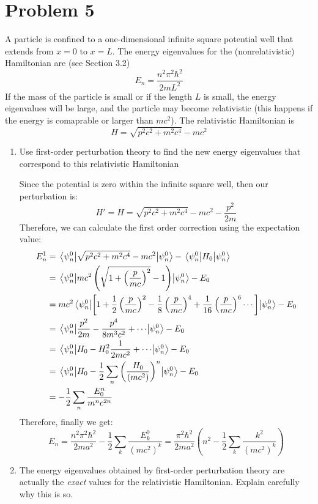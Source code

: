 \documentclass[10pt]{article}
\begin{document}
    \section*{Problem 5}
    A particle is confined to a one-dimensional infinite square potential well that extends from $x = 0$ to $x = L$. The energy eigenvalues for the (nonrelativistic) Hamiltonian are (see Section 3.2)
    \[ E_n = \frac{n^2 \pi^2 \hbar^2}{2mL^2}\] 
    If the mass of the particle is small or if the length $L$ is small, the energy eigenvalues will be large, and the particle may become relativistic (this happens if the energy is comaprable or larger than $mc^2$). The relativistic Hamiltonian is
    \[ H = \sqrt{p^2 c^2 + m^2 c^4} - mc^2\]
    \begin{enumerate}[label=(\alph*)]
        \item Use first-order perturbation theory to find the new energy eigenvalues that correspond to this relativistic Hamiltonian

        \begin{solution}
            Since the potential is zero within the infinite square well, then our perturbation is:
            \[ H' = H = \sqrt{p^2 c^2 + m^2 c^4} - mc^2 - \frac{p^2}{2m}\]
            Therefore, we can calculate the first order correction using the expectation value: 
            \begin{align*}
                E_n^1& = \expval{\sqrt{p^2 c^2 + m^2 c^4} - mc^2}{\psi_n^0} - \expval{H_0}{\psi_n^0}\\
                &= \expval{mc^2 \left(\sqrt{1 + \left( \frac{p}{mc}\right)^2} - 1\right)}{\psi_n^0} - E_0\\
                &= mc^2 \expval{\left[1 + \frac{1}{2} \left( \frac{p}{mc}\right)^2 - \frac{1}{8} \left( \frac{p}{mc}\right)^4 + \frac{1}{16} \left( \frac{p}{mc}\right)^6 \cdots \right]}{\psi_n^0} - E_0\\
                &= \expval{\frac{p^2}{2m} - \frac{p^4}{8m^3c^2} + \cdots}{\psi_n^0} - E_0\\
                &= \expval{H_0 - H_0^2 \frac{1}{2mc^2}+ \cdots }{\psi_n^0} - E_0\\
                &= \expval{H_0 - \frac{1}{2} \sum_n \left(\frac{H_0}{(mc^2)}\right)^n}{\psi_n^0} - E_0\\
                &= -\frac{1}{2} \sum_n \frac{E_0^n}{m^n c^{2n}}
            \end{align*}
            Therefore, finally we get: 
            \[ E_n = \frac{n^2 \pi^2 \hbar^2}{2ma^2} - \frac{1}{2} \sum_k \frac{E_k^0}{(mc^2)^k} = \frac{\pi^2 \hbar^2}{2ma^2}\left( n^2 - \frac{1}{2} \sum_k \frac{k^2}{(mc^2)^k}\right)\]
        \end{solution}
        \item The energy eigenvalues obtained by first-order perturbation theory are actually the \textit{exact} values for the relativistic Hamiltonian. Explain carefully why this is so.
        

\end{enumerate}
\end{document}
